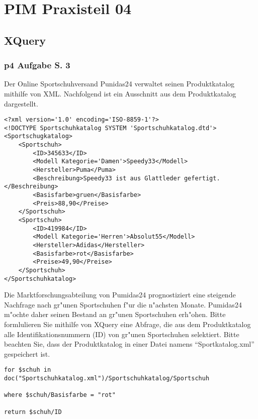 

\chapter{PIM Praxisteil 04}

\section{XQuery}

\subsection{p4 Aufgabe S. 3}

Der Online Sportschuhversand Punidas24 verwaltet seinen Produktkatalog mithilfe von XML.
Nachfolgend ist ein Ausschnitt aus dem Produktkatalog dargestellt.\\

\lstset{style=customXML}
\begin{lstlisting}
<?xml version='1.0' encoding='ISO-8859-1'?>
<!DOCTYPE Sportschuhkatalog SYSTEM 'Sportschuhkatalog.dtd'>
<Sportschugkatalog>
    <Sportschuh>
        <ID>345633</ID>
        <Modell Kategorie='Damen'>Speedy33</Modell>
        <Hersteller>Puma</Puma>
        <Beschreibung>Speedy33 ist aus Glattleder gefertigt.</Beschreibung>
        <Basisfarbe>gruen</Basisfarbe>
        <Preis>88,90</Preise>
    </Sportschuh>
    <Sportschuh>
        <ID>419984</ID>
        <Modell Kategorie='Herren'>Absolut55</Modell>
        <Hersteller>Adidas</Hersteller>
        <Basisfarbe>rot</Basisfarbe>
        <Preise>49,90</Preise>
    </Sportschuh>
</Sportschuhkatalog>
\end{lstlisting}

\noindent
Die Marktforschungsabteilung von Pumidas24 prognostiziert eine steigende Nachfrage nach gr"unen Sportschuhen f"ur die n"achsten Monate.
Pumidas24 m"ochte daher seinen Bestand an gr"unen Sportschuhen erh"ohen.
Bitte formlulieren Sie mithilfe von XQuery eine Abfrage, die aus dem Produktkatalog alle Identifikationsnummern (ID) von gr"unen Sportschuhen selektiert.
Bitte beachten Sie, dass der Produktkatalog in einer Datei namens "`Sportkatalog.xml"' gespeichert ist.\\

\lstset{language=PHP}
\begin{lstlisting}
for $schuh in doc("Sportschuhkatalog.xml")/Sportschuhkatalog/Sportschuh

where $schuh/Basisfarbe = "rot"

return $schuh/ID
\end{lstlisting} %

